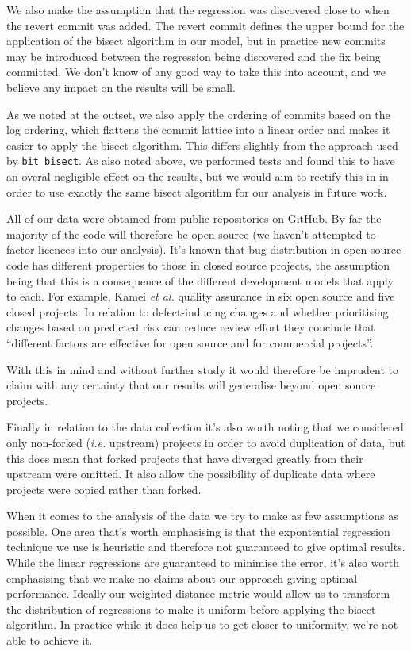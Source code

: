 \documentclass[pdflatex, sn-mathphys, referee]{sn-jnl}%
\theoremstyle{thmstyleone}%
\theoremstyle{thmstyletwo}%
\theoremstyle{thmstylethree}%
\def\etal{{\it et al.}}
\def\ie{{\it i.e.}}
\def\code{\tt}
\theoremstyle{thmstyleone}
\begin{document}
We also make the assumption that the regression was discovered close to when the revert commit was added. The revert commit defines the upper bound for the application of the bisect algorithm in our model, but in practice new commits may be introduced between the regression being discovered and the fix being committed. We don't know of any good way to take this into account, and we believe any impact on the results will be small.

As we noted at the outset, we also apply the ordering of commits based on the log ordering, which flattens the commit lattice into a linear order and makes it easier to apply the bisect algorithm. This differs slightly from the approach used by {\code bit bisect}. As also noted above, we performed tests and found this to have an overal negligible effect on the results, but we would aim to rectify this in in order to use exactly the same bisect algorithm for our analysis in future work.

All of our data were obtained from public repositories on GitHub. By far the majority of the code will therefore be open source (we haven't attempted to factor licences into our analysis). It's known that bug distribution in open source code has different properties to those in closed source projects, the assumption being that this is a consequence of the different development models that apply to each. For example, Kamei \etal \cite{kamei2013} quality assurance in six open source and five closed projects. In relation to defect-inducing changes and whether prioritising changes based on predicted risk can reduce review effort they conclude that ``different factors are effective for open source and for commercial projects''.

With this in mind and without further study it would therefore be imprudent to claim with any certainty that our results will generalise beyond open source projects.

Finally in relation to the data collection it's also worth noting that we considered only non-forked (\ie\/ upstream) projects in order to avoid duplication of data, but this does mean that forked projects that have diverged greatly from their upstream were omitted. It also allow the possibility of duplicate data where projects were copied rather than forked.

When it comes to the analysis of the data we try to make as few assumptions as possible. One area that's worth emphasising is that the expontential regression technique we use is heuristic and therefore not guaranteed to give optimal results. While the linear regressions are guaranteed to minimise the error, it's also worth emphasising that we make no claims about our approach giving optimal performance. Ideally our weighted distance metric would allow us to transform the distribution of regressions to make it uniform before applying the bisect algorithm. In practice while it does help us to get closer to uniformity, we're not able to achieve it.
\end{document}
